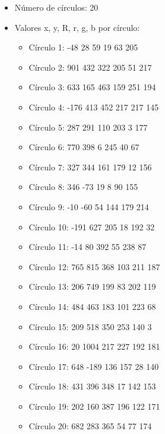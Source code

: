 \documentclass[12pt, letterpaper]{article}
\begin{document}
\begin{flushleft}
\begin{enumerate}
\begin{itemize}
                \begin{itemize}
                    \item Número de círculos: 20
                    \item Valores x, y, R, r, g, b por círculo:
                    \begin{itemize}
                        \item Círculo 1: -48 28 59 19 63 205
                        \item Círculo 2: 901 432 322 205 51 217
                        \item Círculo 3: 633 165 463 159 251 194
                        \item Círculo 4: -176 413 452 217 217 145
                        \item Círculo 5: 287 291 110 203 3 177
                        \item Círculo 6: 770 398 6 245 40 67
                        \item Círculo 7: 327 344 161 179 12 156
                        \item Círculo 8: 346 -73 19 8 90 155
                        \item Círculo 9: -10 -60 54 144 179 214
                        \item Círculo 10: -191 627 205 18 192 32
                        \item Círculo 11: -14 80 392 55 238 87
                        \item Círculo 12: 765 815 368 103 211 187
                        \item Círculo 13: 206 749 199 83 202 119
                        \item Círculo 14: 484 463 183 101 223 68
                        \item Círculo 15: 209 518 350 253 140 3
                        \item Círculo 16: 20 1004 217 227 192 181
                        \item Círculo 17: 648 -189 136 157 28 140
                        \item Círculo 18: 431 396 348 17 142 153
                        \item Círculo 19: 202 160 387 196 122 171
                        \item Círculo 20: 682 283 365 54 77 174
                    \end{itemize}
                \end{itemize}
            \end{itemize}


\end{enumerate}
\end{flushleft}
\end{document}
